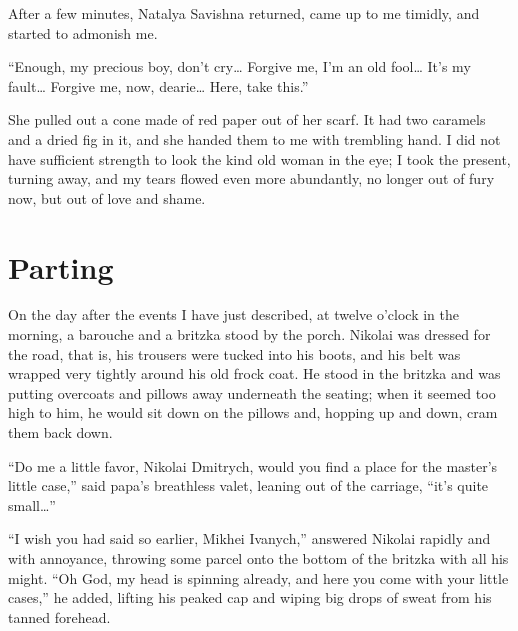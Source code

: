 After a few minutes, Natalya Savishna returned, came up to me timidly, and started to admonish me.

``Enough, my precious boy, don't cry\ldots{} Forgive me, I'm an old fool\ldots{} It's my fault\ldots{} Forgive me, now, dearie\ldots{} Here, take this.'' %

She pulled out a cone made of red paper out of her scarf. It had two caramels and a dried fig in it, and she handed them to me with trembling hand. I did not have sufficient strength to look the kind old woman in the eye; I took the present, turning away, and my tears flowed even more abundantly, no longer out of fury now, but out of love and shame.

\chapter{Parting} %

On the day after the events I have just described, at twelve o'clock in the morning, a barouche and a britzka stood by the porch. Nikolai was dressed for the road, that is, his trousers were tucked into his boots, and his belt was wrapped very tightly around his old frock coat. He stood in the britzka and was putting overcoats and pillows away underneath the seating; when it seemed too high to him, he would sit down on the pillows and, hopping up and down, cram them back down.

``Do me a little favor, Nikolai Dmitrych, would you find a place for the master's little case,'' said papa's breathless valet, leaning out of the carriage, ``it's quite small\ldots{}'' %

``I wish you had said so earlier, Mikhei Ivanych,'' answered Nikolai rapidly and with annoyance, throwing some parcel onto the bottom of the britzka with all his might. ``Oh God, my head is spinning already, and here you come with your little cases,'' he added, lifting his peaked cap and wiping big drops of sweat from his tanned forehead. %

